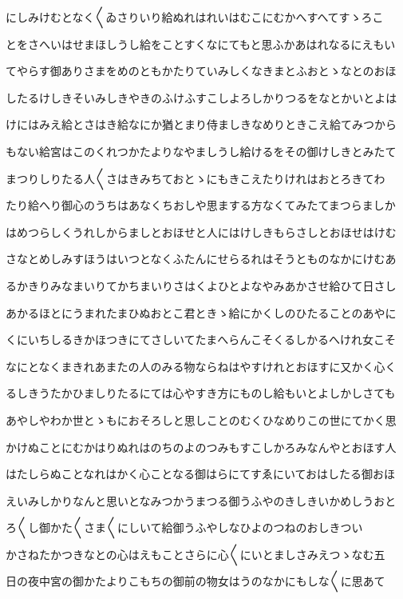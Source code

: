 \documentclass[a4paper,11pt,landscape]{ltjtarticle}
\begin{document}
にしみけむとなく〱ゐさりいり給ぬれはれいはむこにむかへすへてすゝろこ
\par\medskip
とをさへいはせまほしうし給をことすくなにてもと思ふかあはれなるにえもい
\par\medskip
てやらす御ありさまをめのともかたりていみしくなきまとふおとゝなとのおほ
\par\medskip
したるけしきそいみしきやきのふけふすこしよろしかりつるをなとかいとよは
\par\medskip
けにはみえ給とさはき給なにか猶とまり侍ましきなめりときこえ給てみつから
\par\medskip
もない給宮はこのくれつかたよりなやましうし給けるをその御けしきとみたて
\par\medskip
まつりしりたる人〱さはきみちておとゝにもきこえたりけれはおとろきてわ
\par\medskip
たり給へり御心のうちはあなくちおしや思まする方なくてみたてまつらましか
\par\medskip
はめつらしくうれしからましとおほせと人にはけしきもらさしとおほせはけむ
\par\medskip
さなとめしみすほうはいつとなくふたんにせらるれはそうとものなかにけむあ
\par\medskip
るかきりみなまいりてかちまいりさはくよひとよなやみあかさせ給ひて日さし
\par\medskip
あかるほとにうまれたまひぬおとこ君ときゝ給にかくしのひたることのあやに
\par\medskip
くにいちしるきかほつきにてさしいてたまへらんこそくるしかるへけれ女こそ
\par\medskip
なにとなくまきれあまたの人のみる物ならねはやすけれとおほすに又かく心く
\par\medskip
るしきうたかひましりたるにては心やすき方にものし給もいとよしかしさても
\par\medskip
あやしやわか世とゝもにおそろしと思しことのむくひなめりこの世にてかく思
\par\medskip
かけぬことにむかはりぬれはのちのよのつみもすこしかろみなんやとおほす人
\par\medskip
はたしらぬことなれはかく心ことなる御はらにてすゑにいておはしたる御おほ
\par\medskip
えいみしかりなんと思いとなみつかうまつる御うふやのきしきいかめしうおと
\par\medskip
ろ〱し御かた〱さま〱にしいて給御うふやしなひよのつねのおしきつい
\par\medskip
かさねたかつきなとの心はえもことさらに心〱にいとましさみえつゝなむ五
\par\medskip
日の夜中宮の御かたよりこもちの御前の物女はうのなかにもしな〱に思あて
\end{document}
